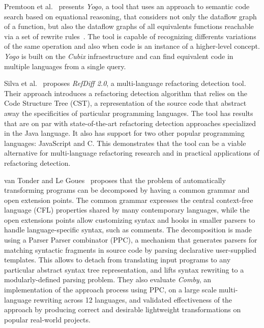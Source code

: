 Premtoon et al.~\cite{premtoon2020-code-search-equational-reasoning} presents 
\textit{Yogo}, a tool that uses an approach to semantic code search 
based on equational reasoning, that considers not only the dataflow graph of 
a function, but also the dataflow graphs of all equivalents functions reachable 
via a set of rewrite rules~\cite{premtoon2020-code-search-equational-reasoning}. 
The tool is capable of recognizing differents variations of the same operation 
and also when code is an instance of a higher-level concept.
\textit{Yogo} is built on the \textit{Cubix} infraestructure and can find 
equivalent code in multiple languages from a single query.

Silva et al.~\cite{silva2021-refdiff} proposes \textit{RefDiff 2.0}, a 
multi-language refactoring detection tool. Their approach introduces a 
refactoring detection algorithm that relies on the Code Structure Tree 
(CST), a representation of the source code that abstract away the 
specificities of particular programming languages. 
The tool has results that are on par with state-of-the-art refactoring 
detection approaches specialized in the Java language. It also has support 
for two other popular programming languages: JavaScript and C. This
demonstrates that the tool can be a viable alternative for multi-language
refactoring research and in practical applications of refactoring detection.

van Tonder and Le Goues~\cite{vanTonder2019-syntax-transformation-ppc} proposes
that the problem of automatically transforming programs can be decomposed by 
having a common grammar and open extension points. The common grammar expresses 
the central context-free language (CFL) properties shared by many contemporary 
languages, while the open extensions points allow customizing syntax and hooks 
in smaller parsers to handle language-specific syntax, such as comments. 
The decomposition is made using a Parser Parser combinator (PPC), a mechanism 
that generates parsers for matching syntactic fragments in source code by parsing 
declarative user-supplied templates. 
This allows to detach from translating input programs to any particular 
abstract syntax tree representation, and lifts syntax rewriting to a 
modularly-defined parsing problem. 
They also evaluate \textit{Comby}, an implementation of the approach process 
using PPC, on a large scale multi-language rewriting across 12 languages, and 
validated effectiveness of the approach by producing correct and desirable 
lightweight transformations on popular real-world projects.

